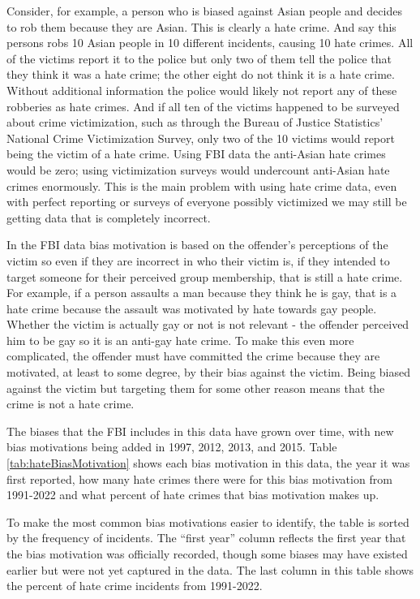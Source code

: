 \documentclass[
]{krantz}
\begin{document}
Consider, for example, a person who is biased against Asian
people and decides to rob them because they are Asian. This
is clearly a hate crime. And say this persons robs 10 Asian
people in 10 different incidents, causing 10 hate crimes.
All of the victims report it to the police but only two of
them tell the police that they think it was a hate crime;
the other eight do not think it is a hate crime. Without
additional information the police would likely not report
any of these robberies as hate crimes. And if all ten of the
victims happened to be surveyed about crime victimization,
such as through the Bureau of Justice Statistics' National
Crime Victimization Survey, only two of the 10 victims would
report being the victim of a hate crime. Using FBI data the
anti-Asian hate crimes would be zero; using victimization
surveys would undercount anti-Asian hate crimes enormously.
This is the main problem with using hate crime data, even
with perfect reporting or surveys of everyone possibly
victimized we may still be getting data that is completely
incorrect.

In the FBI data bias motivation is based on the offender's
perceptions of the victim so even if they are incorrect in
who their victim is, if they intended to target someone for
their perceived group membership, that is still a hate
crime. For example, if a person assaults a man because they
think he is gay, that is a hate crime because the assault
was motivated by hate towards gay people. Whether the victim
is actually gay or not is not relevant - the offender
perceived him to be gay so it is an anti-gay hate crime. To
make this even more complicated, the offender must have
committed the crime because they are motivated, at least to
some degree, by their bias against the victim. Being biased
against the victim but targeting them for some other reason
means that the crime is not a hate crime.

The biases that the FBI includes in this data have grown
over time, with new bias motivations being added in 1997,
2012, 2013, and 2015. Table \ref{tab:hateBiasMotivation}
shows each bias motivation in this data, the year it was
first reported, how many hate crimes there were for this
bias motivation from 1991-2022 and what percent of hate
crimes that bias motivation makes up.

To make the most common bias motivations easier to identify,
the table is sorted by the frequency of incidents. The
``first year'' column reflects the first year that the bias
motivation was officially recorded, though some biases may
have existed earlier but were not yet captured in the data.
The last column in this table shows the percent of hate
crime incidents from 1991-2022.
\end{document}
